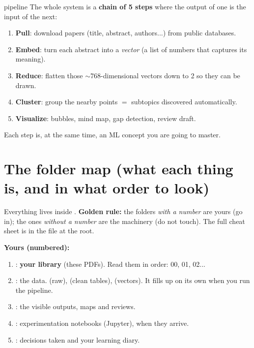 \documentclass[11pt,a4paper]{article}
\begin{document}
\begin{concepto}{pipeline}
The whole system is a \textbf{chain of 5 steps} where the output of one is the input of
the next:
\begin{center}
\end{center}
\begin{enumerate}
  \item \textbf{Pull}: download papers (title, abstract, authors...) from public databases.
  \item \textbf{Embed}: turn each abstract into a \emph{vector} (a list of numbers that captures its meaning).
  \item \textbf{Reduce}: flatten those $\sim$768-dimensional vectors down to 2 so they can be drawn.
  \item \textbf{Cluster}: group the nearby points $=$ subtopics discovered automatically.
  \item \textbf{Visualize}: bubbles, mind map, gap detection, review draft.
\end{enumerate}
Each step is, at the same time, an ML concept you are going to master.
\end{concepto}

\section{The folder map (what each thing is, and in what order to look)}

Everything lives inside .
\textbf{Golden rule:} the folders \emph{with a number} are yours (go in); the ones
\emph{without a number} are the machinery (do not touch). The full cheat sheet is in the
file  at the root.

\textbf{Yours (numbered):}
\begin{enumerate}
  \item {}: \textbf{your library} (these PDFs). Read them in order: 00, 01, 02...
  \item {}: the data.  (raw),  (clean tables),
         (vectors). It fills up on its own when you run the pipeline.
  \item {}: the visible outputs, maps and reviews.
  \item {}: experimentation notebooks (Jupyter), when they arrive.
  \item {}: decisions taken and your learning diary.
\end{enumerate}
\end{document}
